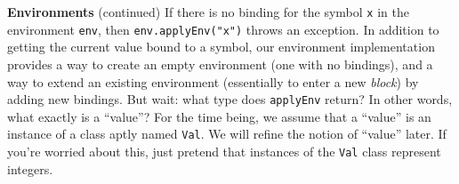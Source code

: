 \begin{minipage}[t]{\sw}
\slidenumber
\LARGE
{\bf Environments} (continued)\exx
If there is no binding for the symbol \verb'x' in the environment \verb'env',
then \verb'env.applyEnv("x")' throws an exception.\exx
In addition to getting the current value bound to a symbol,
our environment implementation provides
a way to create an empty environment (one with no bindings),
and a way to extend an existing environment
(essentially to enter a new {\em block})
by adding new bindings.\exx
But wait: what type does \verb'applyEnv' return?
In other words, what exactly is a ``value''?
For the time being, we assume that a ``value'' is an instance
of a class aptly named \verb'Val'.
We will refine the notion of ``value'' later.
If you're worried about this,
just pretend that instances of the \verb'Val' class
represent integers.
\end{minipage}
\clearpage
